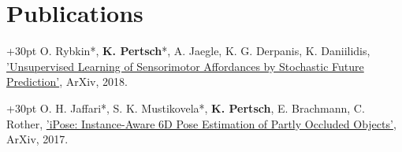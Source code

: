 \documentclass[letterpaper,11pt]{article}
\begin{document}
\section{Publications}
\hangindent+30pt 
O. Rybkin*, \textbf{K. Pertsch}*, A. Jaegle, K. G. Derpanis, K. Daniilidis, \href{https://arxiv.org/pdf/1806.09655.pdf}{'Unsupervised Learning of Sensorimotor Affordances by Stochastic Future Prediction'}, ArXiv, 2018.

\hangindent+30pt 
O. H. Jaffari*, S. K. Mustikovela*, \textbf{K. Pertsch}, E. Brachmann, C. Rother, \href{https://arxiv.org/pdf/1712.01924.pdf}{'iPose: Instance-Aware 6D Pose Estimation of Partly Occluded Objects'}, ArXiv, 2017.



\end{document}
